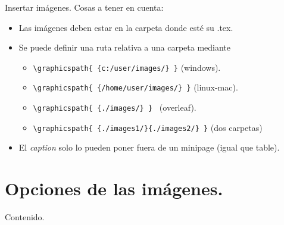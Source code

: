 \documentclass[dvipsnames,xcolor=x11names]{beamer}
\theoremstyle{plain}
\theoremstyle{definition}
\begin{document}
\begin{frame}[fragile]{Insertar imágenes.}
Cosas a tener en cuenta:
    \begin{itemize}
        \item Las imágenes deben estar en la carpeta donde esté su .tex. \pause
        \item Se puede definir una ruta relativa a una carpeta mediante \begin{itemize}
            \item \verb!\graphicspath{ {c:/user/images/} }! (windows).
            \item \verb!\graphicspath{ {/home/user/images/} }! (linux-mac).
            \item \verb!\graphicspath{ {./images/} } ! (overleaf).
            \item \verb!\graphicspath{ {./images1/}{./images2/} }! (dos carpetas)
        \end{itemize}\pause
        \item El \textit{caption} solo lo pueden poner fuera de un minipage (igual que table).
    \end{itemize}
\end{frame}

\section{Opciones de las imágenes.}
\begin{frame}{Contenido.}
  \tableofcontents[currentsection]
\end{frame}
\end{document}
